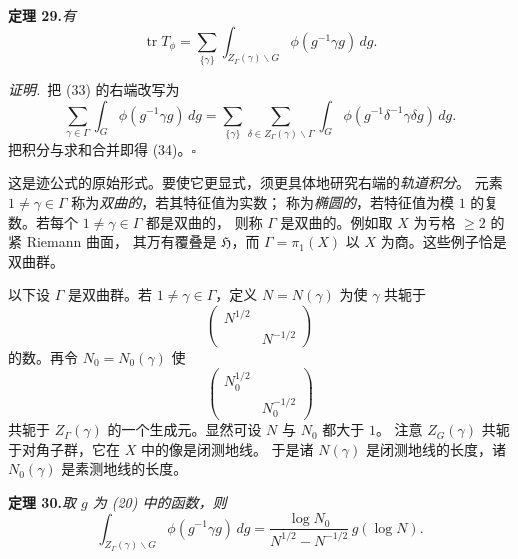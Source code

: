 \par\medskip\noindent\textbf{定理 29.}\quad\emph{有}
\begin{equation}\tag{34}
\operatorname{tr}T_{\phi}=\sum_{\{\gamma\}}\int_{Z_{\Gamma}(\gamma)\backslash G}
\phi(g^{-1}\gamma g)\,dg .
\end{equation}

\smallskip
\noindent\emph{证明.}\ 把 (33) 的右端改写为
\[
\sum_{\gamma\in\Gamma}\int_{G}\phi(g^{-1}\gamma g)\,dg
=\sum_{\{\gamma\}}\sum_{\delta\in Z_{\Gamma}(\gamma)\backslash\Gamma}
\int_{G}\phi(g^{-1}\delta^{-1}\gamma\delta g)\,dg .
\]
把积分与求和合并即得 (34)。\hfill$\square$

这是迹公式的原始形式。要使它更显式，须更具体地研究右端的\emph{轨道积分}。
元素 $1\neq\gamma\in\Gamma$ 称为\emph{双曲的}，若其特征值为实数；
称为\emph{椭圆的}，若特征值为模 $1$ 的复数。若每个 $1\neq\gamma\in\Gamma$ 都是双曲的，
则称 $\Gamma$ 是双曲的。例如取 $X$ 为亏格 $\ge2$ 的紧 Riemann 曲面，
其万有覆叠是 $\mathfrak{H}$，而 $\Gamma=\pi_{1}(X)$ 以 $X$ 为商。这些例子恰是双曲群。

以下设 $\Gamma$ 是双曲群。若 $1\neq\gamma\in\Gamma$，定义 $N=N(\gamma)$ 为使 $\gamma$
共轭于
\begin{equation}\tag{35}
\begin{pmatrix}N^{1/2}&\\&N^{-1/2}\end{pmatrix}
\end{equation}
的数。再令 $N_{0}=N_{0}(\gamma)$ 使
\[
\begin{pmatrix}N_{0}^{1/2}&\\&N_{0}^{-1/2}\end{pmatrix}
\]
共轭于 $Z_{\Gamma}(\gamma)$ 的一个生成元。显然可设 $N$ 与 $N_{0}$ 都大于 $1$。
注意 $Z_{G}(\gamma)$ 共轭于对角子群，它在 $X$ 中的像是闭测地线。
于是诸 $N(\gamma)$ 是闭测地线的长度，诸 $N_{0}(\gamma)$ 是素测地线的长度。

\par\medskip\noindent\textbf{定理 30.}\quad\emph{取 $g$ 为 (20) 中的函数，则}
\begin{equation}\tag{36}
\int_{Z_{\Gamma}(\gamma)\backslash G}\phi(g^{-1}\gamma g)\,dg
=\frac{\log N_{0}}{N^{1/2}-N^{-1/2}}\,g(\log N).
\end{equation}

